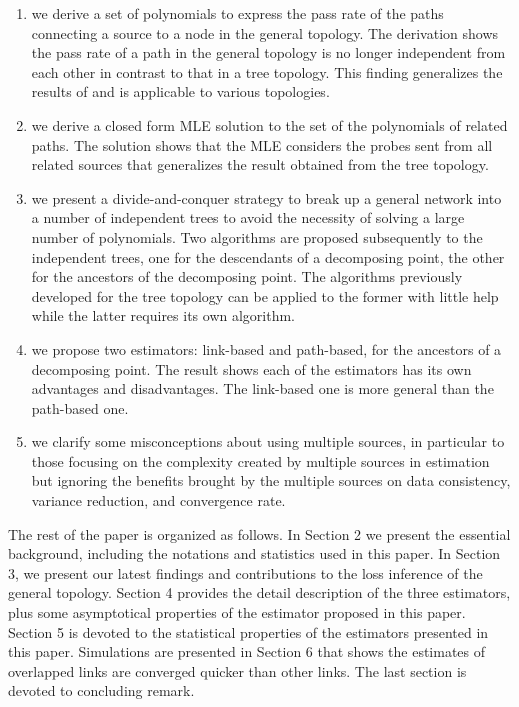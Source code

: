 \documentclass[10pt,twocolumn]{IEEEtran}
\begin{document}
\begin{enumerate}
\item we derive a set of polynomials to express the pass rate of the paths connecting a source to a node in the general topology. The derivation shows
the pass rate of a path in the general topology is no longer
independent from each other in contrast to that in a tree topology.
This finding generalizes the results of \cite{CDHT99} and is
applicable to various topologies.
\item we derive a closed form MLE solution to the set of the polynomials of related paths. The solution shows that the MLE
considers the probes sent from all related sources that generalizes
the result obtained from the tree topology.
\item we present a divide-and-conquer strategy to break up a general network into a number of independent trees to avoid the necessity of
solving a large number of polynomials. Two algorithms are proposed
subsequently to the independent trees, one for the descendants of a
decomposing point, the other for the ancestors of the decomposing
point. The algorithms previously developed for the tree topology can
be applied to the former with little help while the latter requires
its own algorithm.
\item we propose two estimators: link-based and
path-based, for the ancestors of a decomposing point. The result shows
each of the estimators has its own advantages and disadvantages. The
link-based one is more general than the path-based one.
\item we clarify some misconceptions about using multiple sources, in
particular to those focusing on the complexity created by multiple
sources in estimation but ignoring the benefits brought by the
multiple sources on  data consistency, variance reduction, and
convergence rate.
\end{enumerate}

The rest of the paper is organized as follows. In Section 2 we present
the essential background, including the notations and statistics used
in this paper. In Section 3, we present our latest findings and
contributions to the loss inference of the general topology. Section 4
provides the detail description of the three estimators, plus some
asymptotical properties of the estimator proposed in this paper.
Section 5 is devoted to the statistical properties of the estimators
presented in this paper. Simulations are presented in Section 6 that
shows the estimates of overlapped links are converged quicker than
other links. The last section is devoted to concluding remark.
\end{document}
